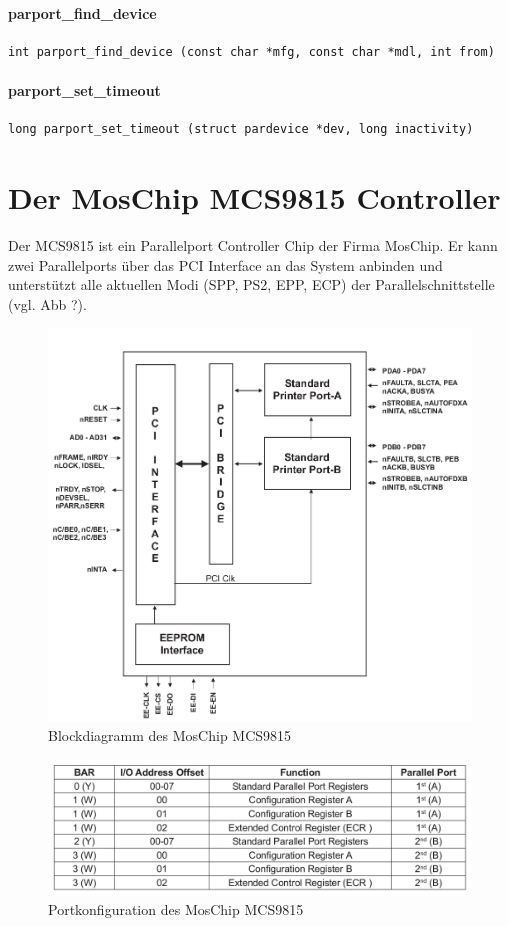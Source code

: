 \documentclass[a4paper,11pt]{article}
\begin{document}
\paragraph{parport\_find\_device}
\begin{verbatim}
int parport_find_device (const char *mfg, const char *mdl, int from)
\end{verbatim}


\paragraph{parport\_set\_timeout}
\begin{verbatim}
long parport_set_timeout (struct pardevice *dev, long inactivity)
\end{verbatim}


\section{Der MosChip MCS9815 Controller}

Der MCS9815 ist ein Parallelport Controller Chip der Firma MosChip. Er kann
zwei Parallelports über das PCI Interface an das System anbinden und unterstützt alle
aktuellen Modi (SPP, PS2, EPP, ECP) der Parallelschnittstelle (vgl. Abb ?).

\begin{figure}[h]
 \centering
 \includegraphics[bb=0 0 724 671,scale=0.5]{./pics/mcs9815_block_diagram.png}
 \caption{Blockdiagramm des MosChip MCS9815}
\end{figure}

\begin{figure}[h]
 \centering
 \includegraphics[scale=0.5]{./pics/mcs9815_ioports.png}
 \caption{Portkonfiguration des MosChip MCS9815}
\end{figure}


\end{document}
